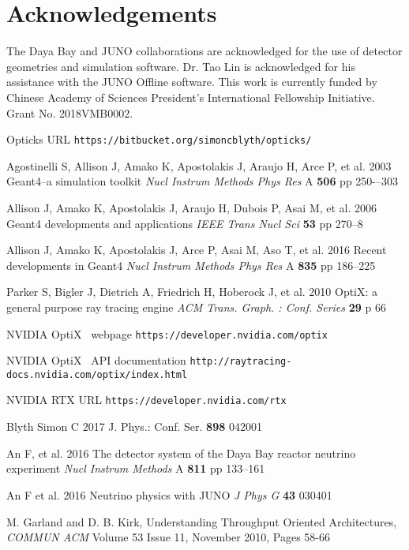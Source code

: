 \documentclass{webofc}
\begin{document}
\section*{Acknowledgements}
%
The Daya Bay and JUNO collaborations are acknowledged for the use of detector 
geometries and simulation software. Dr. Tao Lin is acknowledged for his assistance with 
the JUNO Offline software. 
This work is currently funded by Chinese Academy of Sciences President’s International Fellowship Initiative. 
Grant No. 2018VMB0002.
%
%
%
\begin{thebibliography}{}
%
Opticks URL {\tt https://bitbucket.org/simoncblyth/opticks/}

Agostinelli S, Allison J, Amako K, Apostolakis J, Araujo H, Arce P, et al.
2003
Geant4--a simulation toolkit
{\it Nucl Instrum Methods Phys Res} A {\bf 506} pp 250-–303

Allison J, Amako K, Apostolakis J, Araujo H, Dubois P, Asai M, et al.
2006
Geant4 developments and applications
{\it IEEE Trans Nucl Sci} {\bf 53} pp 270--8

Allison J, Amako K, Apostolakis J, Arce P, Asai M, Aso T, et al.
2016
Recent developments in Geant4
{\it Nucl Instrum Methods Phys Res} A {\bf 835} pp 186--225

Parker S, Bigler J, Dietrich A, Friedrich H, Hoberock J, et al.
2010
OptiX: a general purpose ray tracing engine
{\it ACM Trans. Graph. : Conf. Series} {\bf 29} p 66

NVIDIA{\textregistered} OptiX\texttrademark~ webpage {\tt https://developer.nvidia.com/optix}

NVIDIA{\textregistered} OptiX\texttrademark~ API documentation {\tt http://raytracing-docs.nvidia.com/optix/index.html}

NVIDIA RTX URL {\tt https://developer.nvidia.com/rtx}

Blyth Simon C 2017 J. Phys.: Conf. Ser. {\bf 898} 042001

An F, et al.
2016
The detector system of the Daya Bay reactor neutrino experiment
{\it Nucl Instrum Methods} A {\bf 811} pp 133--161

An F et al.
2016
Neutrino physics with JUNO
{\it J Phys G} {\bf 43} 030401


M. Garland and D. B. Kirk, Understanding Throughput Oriented Architectures, 
{\it COMMUN ACM} Volume 53 Issue 11, November 2010, Pages 58-66  	



\end{thebibliography}
\end{document}
